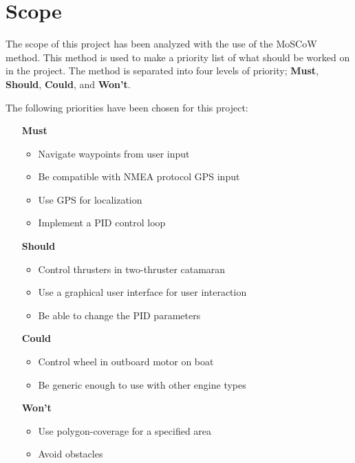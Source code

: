 \newpage
\chapter{Scope}
The scope of this project has been analyzed with the use of the MoSCoW method. This method is used to make a priority list of what should be worked on in the project. The method is separated into four levels of priority; \textbf{Must}, \textbf{Should}, \textbf{Could}, and \textbf{Won't}.

\noindent The following priorities have been chosen for this project:
\begin{itemize}
	\item[\textbf{Must}]
		\begin{itemize}
			\item Navigate waypoints from user input
			\item Be compatible with NMEA protocol GPS input
			\item Use GPS for localization
			\item Implement a PID control loop
		\end{itemize}
	\item[\textbf{Should}]
		\begin{itemize}
			\item Control thrusters in two-thruster catamaran
			\item Use a graphical user interface for user interaction
			\item Be able to change the PID parameters
		\end{itemize}
	\item[\textbf{Could}] 
		\begin{itemize}
			\item Control wheel in outboard motor on boat
			\item Be generic enough to use with other engine types
		\end{itemize}
	\item[\textbf{Won't}]
		\begin{itemize}
			\item Use polygon-coverage for a specified area
			\item Avoid obstacles
		\end{itemize}
\end{itemize}
